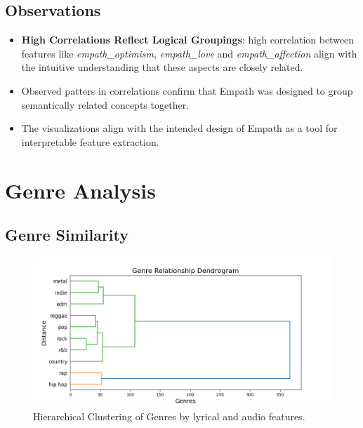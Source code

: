 \subsection*{Observations}

\begin{itemize}
  \item \textbf{High Correlations Reflect Logical Groupings}: high correlation
    between features like \textit{empath\_optimism}, \textit{empath\_love} and
    \textit{empath\_affection} align with the intuitive understanding that
    these aspects are closely related.
  \item Observed patters in correlations confirm that Empath was designed to
    group semantically related concepts together.
  \item The visualizations align with the intended design of Empath as a tool
    for interpretable feature extraction.
\end{itemize}



\section{Genre Analysis}

\subsection{Genre Similarity}

\begin{center}
\begin{figure}[H]
  \centering
  \includegraphics[width=5in]{img/genres_dendrogram.png}
  \caption{Hierarchical Clustering of Genres by lyrical and audio features.}
  \label{Figure:dendrogram_spotify_features}
\end{figure}
\end{center}

